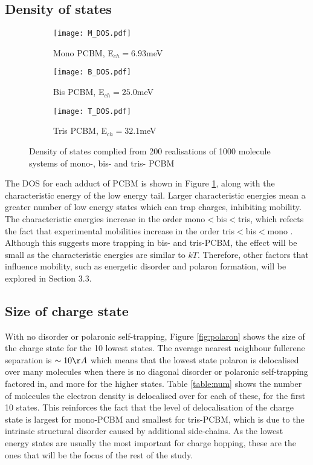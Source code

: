 \documentclass[a4paper,12pt]{article}
\begin{document}
\subsection{Density of states}

\begin{figure}[H]
\centering
\begin{subfigure}[b]{0.3\textwidth}
\texttt{[image: M\_DOS.pdf]}
\caption{Mono PCBM, E$_{ch}=6.93$meV}
\end{subfigure}
\begin{subfigure}[b]{0.3\textwidth}
\texttt{[image: B\_DOS.pdf]}
\caption{Bis PCBM, E$_{ch}=25.0$meV}
\end{subfigure}
\begin{subfigure}[b]{0.3\textwidth}
\texttt{[image: T\_DOS.pdf]}
\caption{Tris PCBM, E$_{ch}=32.1$meV}
\end{subfigure}
\caption{Density of states complied from 200 realisations of 1000 molecule systems of mono-, bis- and tris- PCBM}
\label{fig:DOS}
\end{figure}

\noindent The DOS for each adduct of PCBM is shown in Figure \ref{fig:DOS}, along with the characteristic energy of the low energy tail. Larger characteristic energies mean a greater number of low energy states which can trap charges, inhibiting mobility. The characteristic energies increase in the order mono$<$bis$<$tris, which refects the fact that experimental mobilities increase in the order tris$<$bis$<$mono \cite{Steinera}. Although this suggests more trapping in bis- and tris-PCBM, the effect will be small as the characteristic energies are similar to $kT$. Therefore, other factors that influence mobility, such as energetic disorder and polaron formation, will be explored in Section 3.3.

\subsection{Size of charge state}

\noindent With no disorder or polaronic self-trapping, Figure \ref{fig:polaron} shows the size of the charge state for the 10 lowest states. The average nearest neighbour fullerene separation is $\sim 10\AA$ \cite{To2014} which means that the lowest state polaron is delocalised over many molecules when there is no diagonal disorder or polaronic self-trapping factored in, and more for the higher states. Table \ref{table:num} shows the number of molecules the electron density is delocalised over for each of these, for the first 10 states. This reinforces the fact that the level of delocalisation of the charge state is largest for mono-PCBM and smallest for tris-PCBM, which is due to the intrinsic structural disorder caused by additional side-chains. As the lowest energy states are usually the most important for charge hopping, these are the ones that will be the focus of the rest of the study.  
\end{document}
